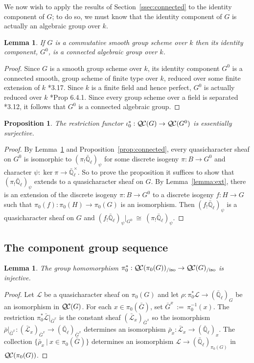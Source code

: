 \documentclass[10pt]{amsart}
\theoremstyle{plain}
\newtheorem{proposition}[theorem]{Proposition}
\newtheorem{lemma}[theorem]{Lemma}
\theoremstyle{definition}
\theoremstyle{remark}
\newcommand{\EE}{\mathbb{\bar Q}_\ell}
\newcommand{\Fq}{k}
\newcommand{\EEx}{\EE^\times}
\newcommand{\ceq}{{\, :=\, }}
\newcommand{\tq}{{\ \vert\ }}
\newcommand{\iso}{{\ \cong\ }}
\newcommand{\qcs}[1]{{\mathcal{#1}}}
\newcommand{\gqcs}[1]{{\mathcal{\bar #1}}}
\newcommand{\QC}{{\mathcal{Q\hskip-0.8pt C}}}
\newcommand{\QCiso}[1]{\QC(#1)_{/\text{iso}}}
\newcommand{\bG}{\bar{G}}
\newcommand{\brho}{{\bar\rho}}
\begin{document}
We now wish to apply the results of Section~\ref{ssec:connected} to the identity component of $G$; to do so, we must know that the identity component of $G$ is actually an algebraic group over $\Fq$.

\begin{lemma} \label{lem:G0alg-grp}
If $G$ is a commutative smooth group scheme over $\Fq$ then its identity component, $G^0$, is a connected algebraic group over $\Fq$.
\end{lemma}
\begin{proof}
 Since $G$ is a smooth group scheme over $\Fq$, its
 identity component $G^0$ is a connected smooth,
 group scheme of finite type over $\Fq$, reduced over some finite extension of $\Fq$
 \cite{vdGeer-Moonen:AbelianVarieties}*{3.17}.
 Since $\Fq$ is a finite field and hence perfect, $G^0$ is actually reduced over $\Fq$
 \cite{EGAIV2}*{Prop 6.4.1}.  Since every group scheme over a field is separated
 \cite{vdGeer-Moonen:AbelianVarieties}*{3.12},
 it follows that $G^0$ is a connected algebraic group.
\end{proof}

\begin{proposition}\label{prop:restriction}
The restriction functor $\iota_0^* : \QC(G)\to \QC(G^0)$ is essentially surjective.
\end{proposition}

\begin{proof}
  By Lemma~\ref{lem:G0alg-grp} and Proposition~\ref{prop:connected}, every
  quasicharacter sheaf on $G^0$ is isomorphic to $(\pi_! \EE)_\psi$ for some discrete isogeny $\pi : B \to G^0$ and character $\psi : \ker \pi \to \EEx$.
  So to prove the proposition it suffices to show that $(\pi_! \EE)_\psi$ extends to a quasicharacter sheaf on $G$.
%
 By Lemma~\ref{lemma:ext}, there is an extension of the
 discrete isogeny $\pi : B \to G^0$ to a discrete isogeny $f : H \to G$
 such that $\pi_0(f) : \pi_0(H)\to \pi_0(G)$ is an isomorphism.
 Then $(f_! \EE)_\psi$ is a quasicharacter sheaf on $G$ and
 $(f_! \EE)_\psi\vert_{G^0} \iso (\pi_! \EE)_\psi$.
\end{proof}

\subsection{The component group sequence} \label{ssec:component}

\begin{lemma}\label{lem:extension}
The group homomorphism $\pi_0^*: \QCiso{\pi_0(G)} \to \QCiso{G}$ is injective.
\end{lemma}
\begin{proof}
Let $\qcs{L}$ be a quasicharacter sheaf on $\pi_0(G)$ and let $\rho : \pi_0^*\qcs{L} \to (\EE)_{G}$ be an isomorphism in $\QC(G)$. 
For each $x\in \pi_0(\bG)$, set $\bG^x \ceq \pi_0^{-1}(x)$.
The restriction $\pi_0^*\gqcs{L}\vert_{\bG^x}$ is the constant sheaf $(\gqcs{L}_x)_{\bG^x}$ so the isomorphism $\brho\vert_{\bG^x} : (\gqcs{L}_x)_{\bG^x} \to (\EE)_{\bG^x}$ determines an isomorphism $\brho_x : \gqcs{L}_x \to (\EE)_x$. The collection $\{ \brho_x \tq x\in \pi_0(\bG) \}$ determines an isomorphism $\qcs{L} \to (\EE)_{\pi_0(G)}$  in $\QC(\pi_0(G))$.
\end{proof}
\end{document}
